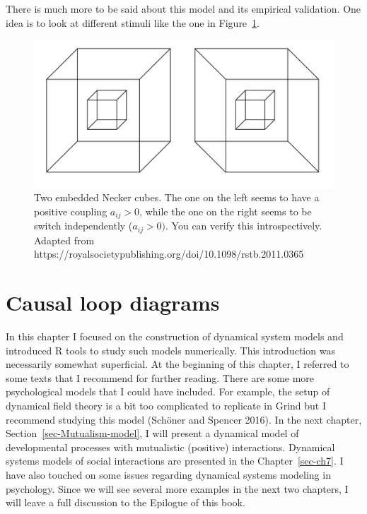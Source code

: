 \documentclass[
  a4paper,
  DIV=11,
  numbers=noendperiod,
  oneside]{scrreprt}
\begin{document}
There is much more to be said about this model and its empirical
validation. One idea is to look at different stimuli like the one in
Figure~\ref{fig-ch4n-img20-old-68}.

\begin{figure}

{\centering \includegraphics{media/ch4n/ch4n-20__figure69.png}

}

\caption{\label{fig-ch4n-img20-old-68}Two embedded Necker cubes. The one
on the left seems to have a positive coupling \(a_{ij} > 0\), while the
one on the right seems to be switch independently (\(a_{ij} > 0)\). You
can verify this introspectively. Adapted from
https://royalsocietypublishing.org/doi/10.1098/rstb.2011.0365}

\end{figure}

\hypertarget{sec-Causal-loop-diagrams}{%
\section{Causal loop diagrams}\label{sec-Causal-loop-diagrams}}

In this chapter I focused on the construction of dynamical system models
and introduced R tools to study such models numerically. This
introduction was necessarily somewhat superficial. At the beginning of
this chapter, I referred to some texts that I recommend for further
reading. There are some more psychological models that I could have
included. For example, the setup of dynamical field theory is a bit too
complicated to replicate in Grind but I recommend studying this model
(Schöner and Spencer 2016). In the next chapter,
Section~\ref{sec-Mutualism-model}, I will present a dynamical model of
developmental processes with mutualistic (positive) interactions.
Dynamical systems models of social interactions are presented in the
Chapter~\ref{sec-ch7}. I have also touched on some issues regarding
dynamical systems modeling in psychology. Since we will see several more
examples in the next two chapters, I will leave a full discussion to the
Epilogue of this book.
\end{document}
